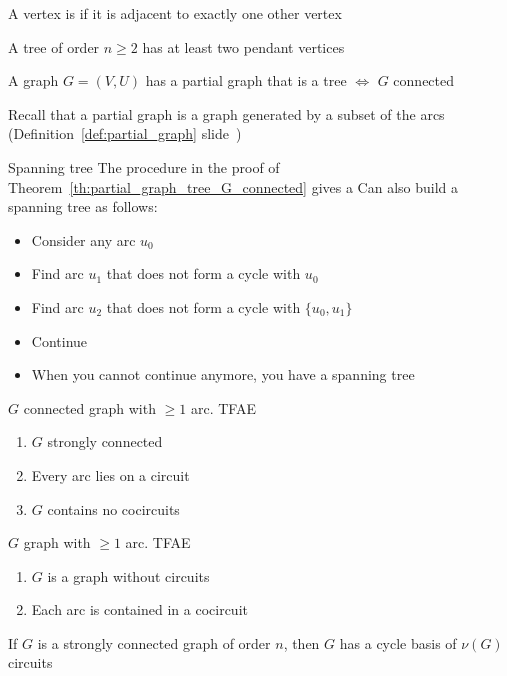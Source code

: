 \documentclass[aspectratio=43]{beamer}
\begin{document}
\begin{frame}
\begin{definition}
A vertex is  if it is adjacent to exactly one other vertex
\end{definition}
\vfill
\begin{theorem}
A tree of order $n\geq 2$ has at least two pendant vertices
\end{theorem}
\end{frame}

\begin{frame}
\begin{theorem}\label{th:partial_graph_tree_G_connected}
A graph $G=(V,U)$ has a partial graph that is a tree $\iff$ $G$ connected
\end{theorem}
\vfill
Recall that a partial graph is a graph generated by a subset of the arcs (Definition~\ref{def:partial_graph} slide~\pageref{def:partial_graph})
\end{frame}

\begin{frame}{Spanning tree}
The procedure in the proof of Theorem~\ref{th:partial_graph_tree_G_connected} gives a 
\vfill
Can also build a spanning tree as follows:
\begin{itemize}
\item Consider any arc $u_0$
\item Find arc $u_1$ that does not form a cycle with $u_0$
\item Find arc $u_2$ that does not form a cycle with $\{u_0,u_1\}$
\item Continue
\item When you cannot continue anymore, you have a spanning tree
\end{itemize}
\end{frame}




\begin{frame}
\begin{theorem}
$G$ connected graph with $\geq 1$ arc. TFAE
\begin{enumerate}
\item $G$ strongly connected
\item Every arc lies on a circuit
\item $G$ contains no cocircuits
\end{enumerate}
\end{theorem}
\end{frame}


\begin{frame}
\begin{theorem}
$G$ graph with $\geq 1$ arc. TFAE
\begin{enumerate}
\item $G$ is a graph without circuits
\item Each arc is contained in a cocircuit
\end{enumerate}
\end{theorem}
\vfill
\begin{theorem}
If $G$ is a strongly connected graph of order $n$, then $G$ has a cycle basis of $\nu(G)$ circuits
\end{theorem}
\end{frame}
\end{document}
